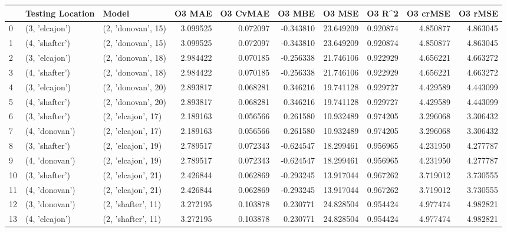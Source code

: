 \begin{tabular}{lllrrrrrrr}
\toprule
{} & Testing Location &               Model &    O3 MAE &  O3 CvMAE &    O3 MBE &     O3 MSE &    O3 R\textasciicircum2 &  O3 crMSE &   O3 rMSE \\
\midrule
0  &   (3, 'elcajon') &  (2, 'donovan', 15) &  3.099525 &  0.072097 & -0.343810 &  23.649209 &  0.920874 &  4.850877 &  4.863045 \\
1  &   (4, 'shafter') &  (2, 'donovan', 15) &  3.099525 &  0.072097 & -0.343810 &  23.649209 &  0.920874 &  4.850877 &  4.863045 \\
2  &   (3, 'elcajon') &  (2, 'donovan', 18) &  2.984422 &  0.070185 & -0.256338 &  21.746106 &  0.922929 &  4.656221 &  4.663272 \\
3  &   (4, 'shafter') &  (2, 'donovan', 18) &  2.984422 &  0.070185 & -0.256338 &  21.746106 &  0.922929 &  4.656221 &  4.663272 \\
4  &   (3, 'elcajon') &  (2, 'donovan', 20) &  2.893817 &  0.068281 &  0.346216 &  19.741128 &  0.929727 &  4.429589 &  4.443099 \\
5  &   (4, 'shafter') &  (2, 'donovan', 20) &  2.893817 &  0.068281 &  0.346216 &  19.741128 &  0.929727 &  4.429589 &  4.443099 \\
6  &   (3, 'shafter') &  (2, 'elcajon', 17) &  2.189163 &  0.056566 &  0.261580 &  10.932489 &  0.974205 &  3.296068 &  3.306432 \\
7  &   (4, 'donovan') &  (2, 'elcajon', 17) &  2.189163 &  0.056566 &  0.261580 &  10.932489 &  0.974205 &  3.296068 &  3.306432 \\
8  &   (3, 'shafter') &  (2, 'elcajon', 19) &  2.789517 &  0.072343 & -0.624547 &  18.299461 &  0.956965 &  4.231950 &  4.277787 \\
9  &   (4, 'donovan') &  (2, 'elcajon', 19) &  2.789517 &  0.072343 & -0.624547 &  18.299461 &  0.956965 &  4.231950 &  4.277787 \\
10 &   (3, 'shafter') &  (2, 'elcajon', 21) &  2.426844 &  0.062869 & -0.293245 &  13.917044 &  0.967262 &  3.719012 &  3.730555 \\
11 &   (4, 'donovan') &  (2, 'elcajon', 21) &  2.426844 &  0.062869 & -0.293245 &  13.917044 &  0.967262 &  3.719012 &  3.730555 \\
12 &   (3, 'donovan') &  (2, 'shafter', 11) &  3.272195 &  0.103878 &  0.230771 &  24.828504 &  0.954424 &  4.977474 &  4.982821 \\
13 &   (4, 'elcajon') &  (2, 'shafter', 11) &  3.272195 &  0.103878 &  0.230771 &  24.828504 &  0.954424 &  4.977474 &  4.982821 \\

\end{tabular}
